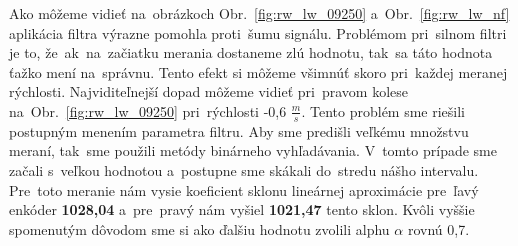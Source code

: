 Ako môžeme vidieť na~obrázkoch Obr.~\ref{fig:rw_lw_09250} a~Obr.~\ref{fig:rw_lw_nf} aplikácia filtra výrazne pomohla proti~šumu signálu.
Problémom pri~silnom filtri je to, že~ak~na~začiatku merania dostaneme zlú hodnotu, tak~sa táto hodnota ťažko mení na~správnu. Tento
efekt si môžeme všimnúť skoro pri~každej meranej rýchlosti. Najviditeľnejší dopad môžeme vidieť pri~pravom kolese
na~Obr.~\ref{fig:rw_lw_09250} pri~rýchlosti -0,6 $\frac{m}{s}$. Tento problém sme riešili postupným menením parametra filtru.
Aby sme predišli veľkému množstvu meraní, tak~sme použili metódy binárneho vyhľadávania. V~tomto prípade sme začali s~veľkou hodnotou
a~postupne sme skákali do~stredu nášho intervalu. Pre~toto meranie nám vysie koeficient sklonu lineárnej aproximácie
pre~ľavý enkóder \textbf{1028,04} a~pre~pravý nám vyšiel \textbf{1021,47} tento sklon. Kvôli vyššie spomenutým
dôvodom sme si ako ďalšiu hodnotu zvolili alphu $\alpha$ rovnú 0,7.

